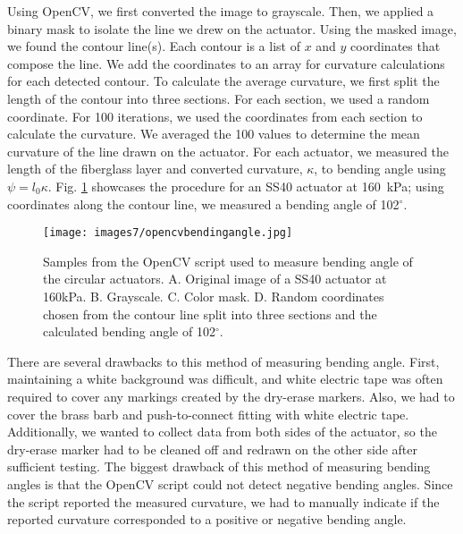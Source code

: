 Using OpenCV, we first converted the image to grayscale. Then, we applied a binary mask to isolate the line we drew on the actuator. Using the masked image, we found the contour line(s). Each contour is a list of $x$ and $y$ coordinates that compose the line. We add the coordinates to an array for curvature calculations for each detected contour. To calculate the average curvature, we first split the length of the contour into three sections. For each section, we used a random coordinate. For 100 iterations, we used the coordinates from each section to calculate the curvature. We averaged the 100 values to determine the mean curvature of the line drawn on the actuator. For each actuator, we measured the length of the fiberglass layer and converted curvature, $\kappa$, to bending angle using $\psi = l_{0}\kappa$. Fig. \ref{fig:opencvbendingangle} showcases the procedure for an SS40 actuator at 160~kPa; using coordinates along the contour line, we measured a bending angle of 102$^\circ$. 

\clearpage
\begin{figure}[h]
    \centering
     \texttt{[image: images7/opencvbendingangle.jpg]}
    \caption{Samples from the OpenCV script used to measure bending angle of the circular actuators. A. Original image of a SS40 actuator at 160kPa. B. Grayscale. C. Color mask. D. Random coordinates chosen from the contour line split into three sections and the calculated bending angle of 102$^\circ$.}
    \label{fig:opencvbendingangle}
\end{figure}

There are several drawbacks to this method of measuring bending angle. First, maintaining a white background was difficult, and white electric tape was often required to cover any markings created by the dry-erase markers. Also, we had to cover the brass barb and push-to-connect fitting with white electric tape. Additionally, we wanted to collect data from both sides of the actuator, so the dry-erase marker had to be cleaned off and redrawn on the other side after sufficient testing. The biggest drawback of this method of measuring bending angles is that the OpenCV script could not detect negative bending angles. Since the script reported the measured curvature, we had to manually indicate if the reported curvature corresponded to a positive or negative bending angle. 